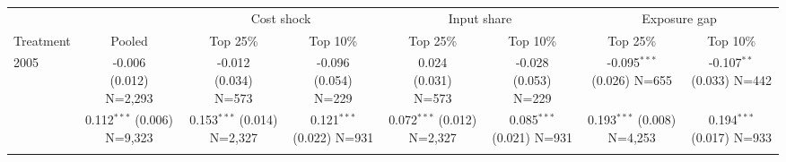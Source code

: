 \begin{tabular}{lccccccc}
\toprule
 & & \multicolumn{2}{c}{Cost shock} & \multicolumn{2}{c}{Input share} & \multicolumn{2}{c}{Exposure gap} \\
\cmidrule(lr){3-4}\cmidrule(lr){5-6}\cmidrule(lr){7-8}
Treatment & Pooled & Top 25\% & Top 10\% & Top 25\% & Top 10\% & Top 25\% & Top 10\% \\
\midrule
2005 & \makecell{-0.006 \\ \footnotesize{(0.012)} \\ \footnotesize{N=2,293}} & \makecell{-0.012 \\ \footnotesize{(0.034)} \\ \footnotesize{N=573}} & \makecell{-0.096 \\ \footnotesize{(0.054)} \\ \footnotesize{N=229}} & \makecell{0.024 \\ \footnotesize{(0.031)} \\ \footnotesize{N=573}} & \makecell{-0.028 \\ \footnotesize{(0.053)} \\ \footnotesize{N=229}} & \makecell{-0.095$^{***}$ \\ \footnotesize{(0.026)} \\ \footnotesize{N=655}} & \makecell{-0.107$^{**}$ \\ \footnotesize{(0.033)} \\ \footnotesize{N=442}} \\\addlinespace
2017 & \makecell{0.112$^{***}$ \\ \footnotesize{(0.006)} \\ \footnotesize{N=9,323}} & \makecell{0.153$^{***}$ \\ \footnotesize{(0.014)} \\ \footnotesize{N=2,327}} & \makecell{0.121$^{***}$ \\ \footnotesize{(0.022)} \\ \footnotesize{N=931}} & \makecell{0.072$^{***}$ \\ \footnotesize{(0.012)} \\ \footnotesize{N=2,327}} & \makecell{0.085$^{***}$ \\ \footnotesize{(0.021)} \\ \footnotesize{N=931}} & \makecell{0.193$^{***}$ \\ \footnotesize{(0.008)} \\ \footnotesize{N=4,253}} & \makecell{0.194$^{***}$ \\ \footnotesize{(0.017)} \\ \footnotesize{N=933}} \\\addlinespace
\bottomrule
\end{tabular}
